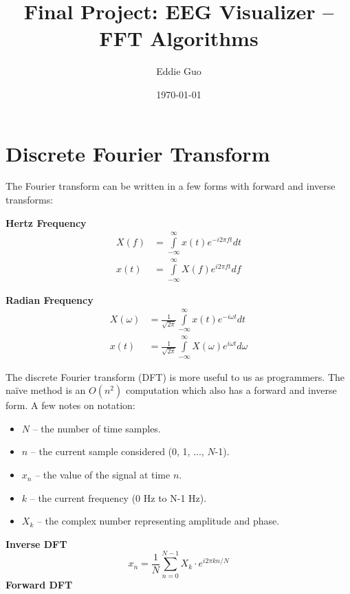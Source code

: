\documentclass{article}
\title{\Large \textbf{Final Project: EEG Visualizer -- FFT Algorithms}}
\author{Eddie Guo}
\date{\today}
\begin{document}
\maketitle
\thispagestyle{fancy}

\section*{Discrete Fourier Transform}
The Fourier transform can be written in a few forms with forward and inverse transforms:

\begin{multicols}{2}
    \textbf{Hertz Frequency}
    \begin{align*}
        X(f) &= \int\limits_{-\infty}^{\infty} x(t) e^{-i 2\pi ft} dt\\
        x(t) &= \int\limits_{-\infty}^{\infty} X(f) e^{i 2\pi ft} df
    \end{align*}

    \textbf{Radian Frequency}
    \begin{align*}
        X(\omega) &= \frac{1}{\sqrt{2\pi}} \int\limits_{-\infty}^{\infty} x(t) e^{-i \omega t} dt\\
        x(t) &= \frac{1}{\sqrt{2\pi}} \int\limits_{-\infty}^{\infty} X(\omega) e^{i \omega t} d\omega
    \end{align*}
\end{multicols}

The discrete Fourier transform (DFT) is more useful to us as programmers. The na\"{i}ve method is an $O(n^2)$ computation which also has a forward and inverse form. A few notes on notation:

\begin{multicols}{2}
    \begin{itemize}
        \item $N$ -- the number of time samples.
        \item $n$ -- the current sample considered (0, 1, ..., $N$-1).
        \item $x_n$ -- the value of the signal at time $n$.
        \item $k$ -- the current frequency (0 Hz to N-1 Hz).
        \item $X_k$ -- the complex number representing amplitude and phase.
    \end{itemize}
\end{multicols}

\textbf{Inverse DFT} $$ x_n = \frac{1}{N} \sum_{n=0}^{N-1} X_k \cdot e^{i 2 \pi k n / N} $$
\textbf{Forward DFT} \vspace{-1em}
\end{document}
